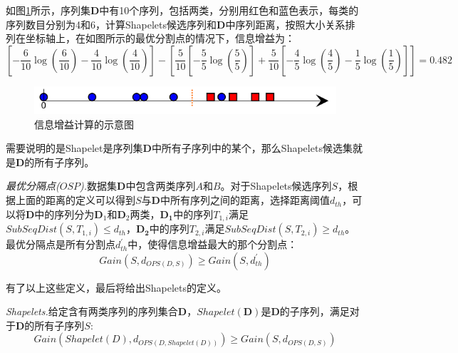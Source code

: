 如图\ref{equ:entropy}所示，序列集$\bm{D}$中有10个序列，包括两类，分别用红色和蓝色表示，每类的序列数目分别为4和6，计算Shapelets候选序列和$\bm{D}$中序列距离，按照大小关系排列在坐标轴上，在如图所示的最优分割点的情况下，信息增益为：
\begin{equation}\label{equ:entropy}
  \left[ { - \frac{6}{{10}}\log \left( {\frac{6}{{10}}} \right) - \frac{4}{{10}}\log \left( {\frac{4}{{10}}} \right)} \right] - \left[ {\frac{5}{{10}}\left[ { - \frac{5}{5}\log \left( {\frac{5}{5}} \right)} \right] + \frac{5}{{10}}\left[ { - \frac{4}{5}\log \left( {\frac{4}{5}} \right) - \frac{1}{5}\log \left( {\frac{1}{5}} \right)} \right]} \right] = 0.482
\end{equation}
\begin{figure}
  \centering
  \includegraphics[width=0.8\linewidth]{./figure/entropy.PNG}
  \caption{信息增益计算的示意图}\label{equ:entropy}
\end{figure}

需要说明的是Shapelet是序列集$\bm{D}$中所有子序列中的某个，那么Shapelets候选集就是$\bm{D}$的所有子序列。

\begin{mydef}
    \emph{最优分隔点($OSP$).}数据集$\bm{D}$中包含两类序列$A$和$B$。对于Shapelets候选序列$S$，根据上面的距离的定义可以得到$S$与$\bm{D}$中所有序列之间的距离，选择距离阈值$d_{th}$，可以将$\bm{D}$中的序列分为$\bm{D}_1$和$\bm{D}_2$两类，$\bm{D_1}$中的序列$T_{1,i}$满足$SubSeqDist(S,T_{1,i}) \le d_{th}$，$\bm{D_2}$中的序列$T_{2,i}$满足$SubSeqDist(S,T_{2,i}) \ge d_{th}$。最优分隔点是所有分割点$d_{th}^{'}$中，使得信息增益最大的那个分割点：
    \begin{equation}\label{equ:12}
      Gain\left( {S,{d_{OPS\left( {D,S} \right)}}} \right) \ge Gain\left( {S,d_{th}^{'}} \right)
    \end{equation}
\end{mydef}

有了以上这些定义，最后将给出Shapelets的定义。

\begin{mydef}
    \emph{Shapelets.}给定含有两类序列的序列集合$\bm{D}$，$Shapelet(\bm{D})$是$\bm{D}$的子序列，满足对于$\bm{D}$的所有子序列$S$:
    \begin{equation}\label{equ:13}
        Gain\left( {Shapelet\left( D \right),{d_{OPS\left( {D,Shapelet\left( D \right)} \right)}}} \right) \ge Gain\left( {S,{d_{OPS\left( {D,S} \right)}}} \right)
    \end{equation}
\end{mydef}

